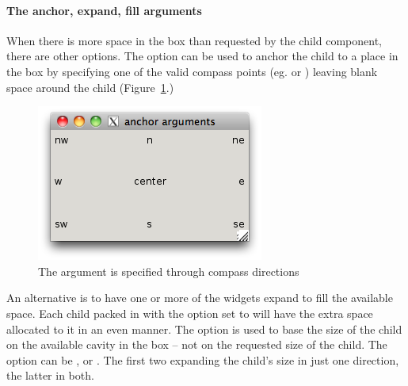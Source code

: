 \paragraph{The anchor, expand, fill arguments}
When there is more space in the box than requested by the child
component, there are other options. The  option
can be used to anchor the child to a place in the box by specifying
one of the valid compass points (eg.  or )
leaving blank space around the child (Figure~\ref{fig:fig-tcltk-anchor-compass}.)

\begin{figure}
  \centering
  \includegraphics[width=.5\textwidth]{fig-tcltk-anchor-compass.png}
  \caption{The  argument is specified through compass directions}
  \label{fig:fig-tcltk-anchor-compass}
\end{figure}


An alternative is to have one or more of the widgets expand to fill
the available space. Each child packed in with the 
option  set to  will have
the extra space allocated  to it in an even manner. The
 option is used to base the size of the child on
the available cavity in the box -- not on the requested size of the
child. The  option can be ,  or
. The first two expanding the child's size in just one
direction, the latter in both.


